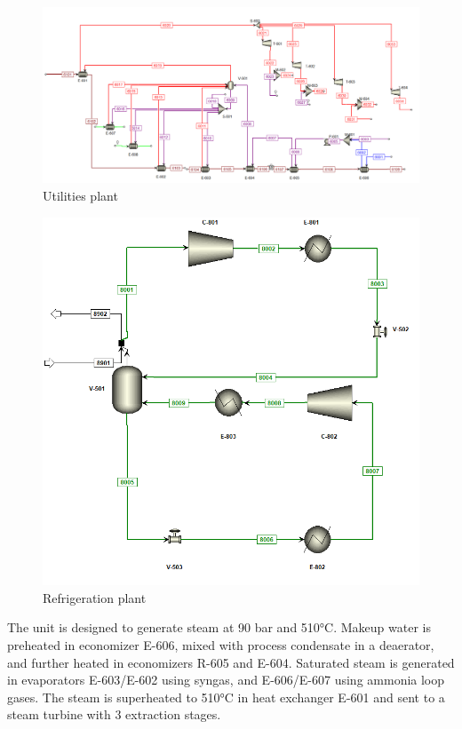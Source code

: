 \documentclass[a4paper, titlepage]{article}
\begin{document}
\begin{figure}
	\includegraphics[width=\textwidth]{img/aspen_utilities.png}
	\caption{Utilities plant}
	\label{img_aspenutilities}
\end{figure}
\begin{figure}
	\includegraphics[width=\textwidth]{img/aspen_chiller.png}
	\caption{Refrigeration plant}
	\label{img_aspenrefrigeration}
\end{figure}


The unit is designed to generate steam at 90 bar and 510°C. Makeup water is preheated in economizer E-606, mixed with
process condensate in a deaerator, and further heated in economizers R-605 and E-604. Saturated steam is generated in 
evaporators E-603/E-602 using syngas, and E-606/E-607 using ammonia loop gases. The steam is superheated to 510°C 
in heat exchanger E-601 and sent to a steam turbine with 3 extraction stages. 
\end{document}
